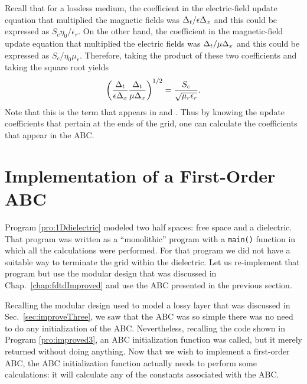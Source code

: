 Recall that for a lossless medium, the coefficient in the
electric-field update equation that multiplied the magnetic fields was
$\Delta_t/\epsilon\Delta_x$ and this could be expressed as
$S_c\eta_0/\epsilon_r$.  On the other hand, the coefficient in the
magnetic-field update equation that multiplied the electric fields was
$\Delta_t/\mu\Delta_x$ and this could be expressed as $S_c/\eta_0\mu_r$.
Therefore, taking the product of these two coefficients and taking the
square root yields
\begin{equation}
  \left(\frac{\Delta_t}{\epsilon\Delta_x}
        \frac{\Delta_t}{\mu\Delta_x}\right)^{1/2} =
        \frac{S_c}{\sqrt{\mu_r\epsilon_r}}.
  \label{eq:abcCoefFirstOrder}
\end{equation}
Note that this is the term that appears in 
and .
Thus by knowing the update coefficients that pertain at the ends of
the grid, one can calculate the coefficients that appear in the ABC.

\section{Implementation of a First-Order ABC}

Program \ref{pro:1Ddielectric} modeled two half spaces: free space and
a dielectric.  That program was written as a ``monolithic'' program
with a {\tt main()} function in which all the calculations were
performed.  For that program we did not have a suitable way to
terminate the grid within the dielectric.  Let us re-implement that
program but use the modular design that was discussed in Chap.\
\ref{chap:fdtdImproved} and use the ABC presented in the previous
section.  

Recalling the modular design used to model a lossy layer that was
discussed in Sec.\ \ref{sec:improveThree}, we saw that the ABC was so
simple there was no need to do any initialization of the ABC.
Nevertheless, recalling the code shown in Program \ref{pro:improved3},
an ABC initialization function was called, but it merely returned
without doing anything.  Now that we wish to implement a first-order
ABC, the ABC initialization function actually needs to perform some
calculations: it will calculate any of the constants associated with
the ABC.  

